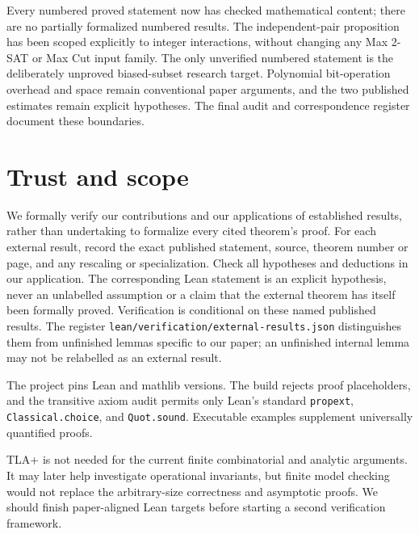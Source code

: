 \documentclass[11pt,a4paper]{article}
\begin{document}
Every numbered proved statement now has checked mathematical content;
there are no partially formalized numbered results. The independent-pair
proposition has been scoped explicitly to integer interactions, without
changing any Max 2-SAT or Max Cut input family. The only unverified numbered
statement is the deliberately unproved biased-subset research target.
Polynomial bit-operation overhead and space remain conventional paper
arguments, and the two published estimates remain explicit hypotheses.
The final audit and correspondence register document these boundaries.

\section{Trust and scope}

We formally verify our contributions and our applications of established
results, rather than undertaking to formalize every cited theorem's proof.
For each external result, record the exact published statement, source,
theorem number or page, and any rescaling or specialization. Check all
hypotheses and deductions in our application. The corresponding Lean
statement is an explicit hypothesis, never an unlabelled assumption or a
claim that the external theorem has itself been formally proved.
Verification is conditional on these named published results. The register
\texttt{lean/verification/external-results.json} distinguishes them from
unfinished lemmas specific to our paper; an unfinished internal lemma may
not be relabelled as an external result.


The project pins Lean and mathlib versions. The build rejects proof
placeholders, and the transitive axiom audit permits only Lean's standard
\texttt{propext}, \texttt{Classical.choice}, and \texttt{Quot.sound}.
Executable examples supplement universally quantified proofs.

TLA+ is not needed for the current finite combinatorial and analytic
arguments. It may later help investigate operational invariants, but
finite model checking would not replace the arbitrary-size correctness
and asymptotic proofs. We should finish paper-aligned Lean targets before
starting a second verification framework.
\end{document}

